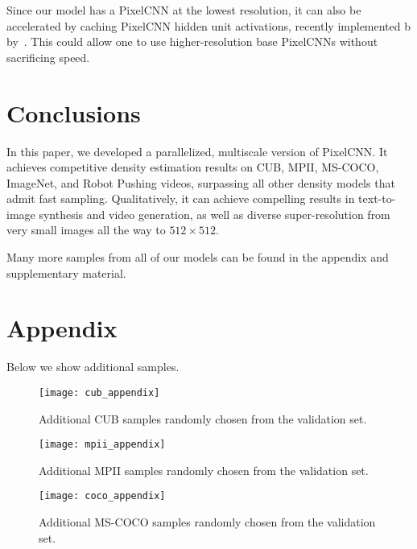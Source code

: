 \documentclass{article}
\begin{document}
Since our model has a PixelCNN at the lowest resolution, it can also be accelerated by caching PixelCNN hidden unit activations, recently implemented b by~\citet{ramachandran2017fastgeneration}.
This could allow one to use higher-resolution base PixelCNNs without sacrificing speed.








\section{Conclusions}
In this paper, we developed a parallelized, multiscale version of PixelCNN.
It achieves competitive density estimation results on
CUB, MPII, MS-COCO, ImageNet, and Robot Pushing videos, surpassing all other density models that admit fast sampling.
Qualitatively, it can achieve compelling results in text-to-image synthesis and video generation, as well as diverse super-resolution from very small images all the way to $512 \times 512$.

Many more samples from all of our models can be found in the appendix and supplementary material.





\newpage
\newpage

\section{Appendix}
Below we show additional samples.

\begin{figure*}[h]
\centering
\texttt{[image: cub\_appendix]}
\vspace{-0.15in}
\caption{Additional CUB samples randomly chosen from the validation set.\label{fig:cub_appendix}}
\end{figure*}

\begin{figure*}[h]
\centering
\texttt{[image: mpii\_appendix]}
\vspace{-0.15in}
\caption{Additional MPII samples randomly chosen from the validation set.\label{fig:mpii_appendix}}
\end{figure*}

\begin{figure*}[h]
\centering
\texttt{[image: coco\_appendix]}
\vspace{-0.15in}
\caption{Additional MS-COCO samples randomly chosen from the validation set.\label{fig:coco_appendix}}
\end{figure*}
\end{document}

